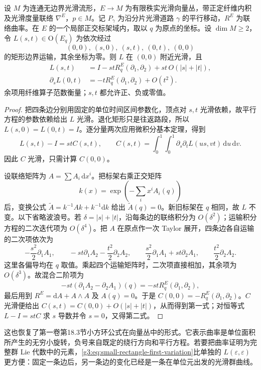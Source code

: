 \begin{proposition}\label{g3:prop:small-rectangle-holonomy}
	设 \(M\) 为连通无边界光滑流形，\(E\to M\) 为有限秩实光滑向量丛，带正定纤维内积及光滑度量联络 \(\nabla^E\)，\(p\in M\)。记 \(P_\gamma\) 为沿分片光滑道路 \(\gamma\) 的平行移动，\(R^E\) 为联络曲率。在 \(E\) 的一个局部正交标架域内，取以 \(q\) 为原点的坐标。设 \(\dim M\geq2\)，令 \(L(s,t)\in\mathrm O(E_q)\) 为依次经过
	\[
		(0,0),\ (s,0),\ (s,t),\ (0,t),\ (0,0)
	\]
	的矩形边界运输，其余坐标为零。则 \(L\) 在 \((0,0)\) 附近光滑，且
	\begin{align}
		L(s,t)&=I-stR^E_q(\partial_1,\partial_2)
		+st\,O(|s|+|t|),\label{g3:eq:small-rectangle-holonomy}\\
		\partial_sL(0,t)&=-tR^E_q(\partial_1,\partial_2)+O(t^2).
		\label{g3:eq:small-rectangle-first-variation}
	\end{align}
	余项用纤维算子范数衡量；\(s,t\) 都允许正、负或零值。
\end{proposition}
\begin{proof}
	把四条边分别用固定的单位时间区间参数化，顶点对 \(s,t\) 光滑依赖，故平行方程的参数依赖给出 \(L\) 光滑。退化矩形只是往返路段，所以 \(L(s,0)=L(0,t)=I\)。逐分量两次应用微积分基本定理，得到
	\[
		L(s,t)-I=stC(s,t),\qquad
		C(s,t)=\int_0^1\!\int_0^1
		\partial_s\partial_tL(us,vt)\,\mathrm du\,\mathrm dv.
	\]
	因此 \(C\) 光滑，只需计算 \(C(0,0)\)。

	设联络矩阵为 \(A=\sum A_i\,\mathrm dx^i\)。把标架右乘正交矩阵
	\[
		k(x)=\exp\left(-\sum_i x^iA_i(q)\right)
	\]
	后，变换公式 \(\widetilde A=k^{-1}Ak+k^{-1}\mathrm dk\) 给出 \(\widetilde A(q)=0\)。新旧标架在 \(q\) 相同，故 \(L\) 不变。以下省略波浪号。若 \(\delta=|s|+|t|\)，沿每条边的联络积分为 \(O(\delta^2)\)；运输积分方程的二次迭代项为 \(O(\delta^4)\)。把 \(A\) 在原点作一次 Taylor 展开，四条边各自运输的二次项依次为
	\[
		-\frac{s^2}{2}\partial_1A_1,\qquad
		-st\partial_1A_2-\frac{t^2}{2}\partial_2A_2,\qquad
		\frac{s^2}{2}\partial_1A_1+st\partial_2A_1,\qquad
		\frac{t^2}{2}\partial_2A_2.
	\]
	这里各偏导均在 \(q\) 取值。乘起四个运输矩阵时，二次项直接相加，其余项为 \(O(\delta^3)\)。故混合二阶项为
	\[
		-st(\partial_1A_2-\partial_2A_1)(q)
		=-stR^E_q(\partial_1,\partial_2),
	\]
	最后用到 \(R^E=\mathrm dA+A\wedge A\) 及 \(A(q)=0\)。于是 \(C(0,0)=-R^E_q(\partial_1,\partial_2)\)。\(C\) 光滑便给出 \(C(s,t)=C(0,0)+O(|s|+|t|)\)，从而得到第一式；对恒等式 \(L-I=stC\) 求 \(s\) 导数并令 \(s=0\)，又得第二式。
\end{proof}

这也恢复了第一卷第18.3节小方环公式在向量丛中的形式。它表示曲率是单位面积所产生的无穷小旋转，负号来自既定的绕行方向和平行方程。若要把曲率证明为完整群 Lie 代数中的元素，\eqref{g3:eq:small-rectangle-first-variation}比单独的 \(L(\varepsilon,\varepsilon)\) 更方便：固定一条边后，另一条边的变化已经是一条在单位元出发的光滑群曲线。

